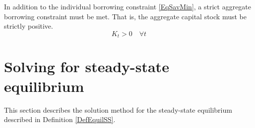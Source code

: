 \documentclass[letterpaper,12pt]{article}
\theoremstyle{definition}
\renewcommand\theenumi{\roman{enumi}}
\begin{document}
  In addition to the individual borrowing constraint \eqref{EqSavMin}, a strict aggregate borrowing constraint must be met. That is, the aggregate capital stock must be strictly positive.
  \begin{equation}\label{EqAggrCapConstr}
    K_t > 0 \quad\forall t
  \end{equation}


\newpage
\section{Solving for steady-state equilibrium}\label{AppSSsolve}

  \setcounter{equation}{0}
  \renewcommand\theenumi{\arabic{enumi}}
  \renewcommand\theenumii{\alph{enumii}}
  \renewcommand\theenumiii{\roman{enumiii}}

  This section describes the solution method for the steady-state equilibrium described in Definition \ref{DefEquilSS}.
\end{document}
